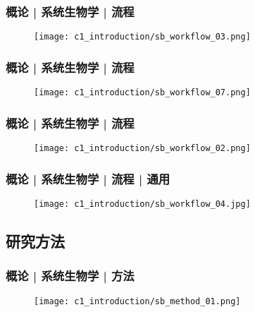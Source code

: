 \begin{frame}
  \frametitle{概论 | 系统生物学 | 流程}
  \begin{figure}
    \centering
    \texttt{[image: c1\_introduction/sb\_workflow\_03.png]}
  \end{figure}
\end{frame}

\begin{frame}
  \frametitle{概论 | 系统生物学 | 流程}
  \begin{figure}
    \centering
    \texttt{[image: c1\_introduction/sb\_workflow\_07.png]}
  \end{figure}
\end{frame}

\begin{frame}
  \frametitle{概论 | 系统生物学 | 流程}
  \begin{figure}
    \centering
    \texttt{[image: c1\_introduction/sb\_workflow\_02.png]}
  \end{figure}
\end{frame}

\begin{frame}
  \frametitle{概论 | 系统生物学 | 流程 | 通用}
  \begin{figure}
    \centering
    \texttt{[image: c1\_introduction/sb\_workflow\_04.jpg]}
  \end{figure}
\end{frame}

%

\subsection{研究方法}
\begin{frame}
  \frametitle{概论 | 系统生物学 | 方法}
  \begin{figure}
    \centering
    \texttt{[image: c1\_introduction/sb\_method\_01.png]}
  \end{figure}
\end{frame}

